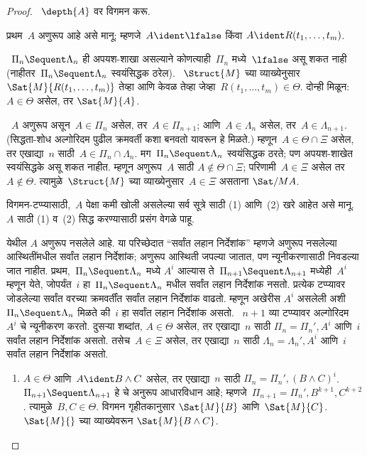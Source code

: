 \begin{proof}
~$\depth{A}$ वर विगमन करू.

प्रथम~$A$ अणुरूप आहे असे मानू;
म्हणजे~$A \ident \lfalse$ किंवा
$A \ident R(t_1, \dots, t_m)$.

~$\Pi_n \Sequent \Lambda_n$ ही अपयश-शाखा
असल्याने कोणत्याही~$\Pi_n$ मध्ये~$\lfalse$
असू शकत नाही (नाहीतर~$\Pi_n \Sequent \Lambda_n$
स्वयंसिद्धक ठरेल). ~$\Struct{M}$ च्या व्याख्येनुसार
$\Sat{M}{R(t_1, \dots, t_m)}$ तेव्हा आणि केवळ तेव्हा
जेव्हा~$R(t_1, \dots, t_m) \in \Theta$.
दोन्ही मिळून: $A \in \Theta$ असेल, तर
$\Sat{M}{A}$.

~$A$ अणुरूप असून~$A \in \Pi_n$ असेल,
तर~$A \in \Pi_{n+1}$; आणि~$A \in \Lambda_n$
असेल, तर~$A \in \Lambda_{n+1}$.
(सिद्धता-शोध अल्गोरिदम पुढील क्रमवर्ती कशा
बनवतो यावरून हे मिळते.) म्हणून~$A \in \Theta \cap \Xi$
असेल, तर एखाद्या~$n$ साठी~$A \in \Pi_n \cap
\Lambda_n$. मग~$\Pi_n \Sequent \Lambda_n$
स्वयंसिद्धक ठरते; पण अपयश-शाखेत स्वयंसिद्धके
असू शकत नाहीत. म्हणून अणुरूप~$A$ साठी
$A \notin \Theta \cap \Xi$; परिणामी~$A \in \Xi$
असेल तर~$A \notin \Theta$. त्यामुळे~$\Struct{M}$
च्या व्याख्येनुसार~$A \in \Xi$ असताना
$\Sat/{M}{A}$.

विगमन-टप्प्यासाठी,~$A$ पेक्षा कमी
खोली असलेल्या सर्व सूत्रे साठी
(1) आणि~(2) खरे आहेत असे मानू. ~$A$ साठी
(1) व~(2) सिद्ध करण्यासाठी प्रसंग वेगळे पाहू.

येथील $A$ अणुरूप नसलेले आहे. या परिच्छेदात
“सर्वांत लहान निर्देशांक” म्हणजे अणुरूप नसलेल्या
आस्थितींमधील सर्वांत लहान निर्देशांक; अणुरूप आस्थिती
जपल्या जातात, पण न्यूनीकरणासाठी निवडल्या जात नाहीत.
प्रथम,~$\Pi_n \Sequent \Lambda_n$ मध्ये
$A^i$ आल्यास ते~$\Pi_{n+1} \Sequent \Lambda_{n+1}$
मध्येही~$A^i$ म्हणून येते, जोपर्यंत~$i$ हा~$\Pi_n \Sequent \Lambda_n$
मधील सर्वांत लहान निर्देशांक नसतो. प्रत्येक
टप्प्यावर जोडलेल्या सर्वांत वरच्या क्रमवर्तींत
सर्वांत लहान निर्देशांक वाढतो. म्हणून अखेरीस
$A^i$ असलेली अशी~$\Pi_n \Sequent \Lambda_n$
मिळते की~$i$ हा सर्वांत लहान निर्देशांक असतो.
~$n+1$ व्या टप्प्यावर अल्गोरिदम~$A^i$ चे
न्यूनीकरण करतो. दुसऱ्या शब्दांत,
$A \in \Theta$ असेल, तर एखाद्या~$n$ साठी
$\Pi_n = \Pi_n', A^i$ आणि~$i$ सर्वांत
लहान निर्देशांक असतो. तसेच~$A \in \Xi$
असेल, तर एखाद्या~$n$ साठी
$\Lambda_n = \Lambda_n', A^i$ आणि~$i$
सर्वांत लहान निर्देशांक असतो.

\begin{enumerate}
  \item $A \in \Theta$ आणि~$A \ident B \land C$
  असेल, तर एखाद्या~$n$ साठी
  $\Pi_n = \Pi_n', (B \land C)^i$.
  ~$\Pi_{n+1} \Sequent \Lambda_{n+1}$ हे
  \LeftR{\land} चे अनुरूप आधारविधान आहे;
  म्हणजे~$\Pi_{n+1} = \Pi_n', B^{k+1}, C^{k+2}$.
  त्यामुळे~$B, C \in \Theta$. विगमन गृहीतकानुसार
  $\Sat{M}{B}$ आणि~$\Sat{M}{C}$.
  ~$\Sat{M}{}$ च्या व्याख्येवरून
  $\Sat{M}{B \land C}$.


\end{enumerate}
\end{proof}

